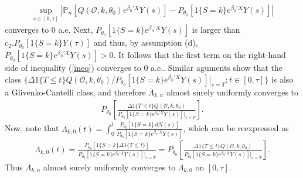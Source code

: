 \documentclass{statsoc}
\begin{document}
\begin{eqnarray*}
\sup_{s\in [0,\tau]}\left|\mathbb P_n\left[Q(\mathcal O,k,\theta_0)e^{\beta_0'X}Y(s)\right]-P_{\theta_0}\left[1\{S=k\}e^{\beta_0'X}Y(s)\right]\right|
\end{eqnarray*}
converges to 0 a.e. Next, $P_{\theta_0}[1\{S=k\}e^{\beta_0'X}Y(s)]$ is larger than $c_2.P_{\theta_0}[1\{S=k\}Y(\tau)]$ and thus, by assumption (d), $P_{\theta_0}[1\{S=k\}e^{\beta_0'X}Y(s)]>0$. It follows that the first term on the right-hand side of inequality (\ref{ineq}) converges to 0 a.e.. Similar aguments show that the class $\{\Delta 1\{T\leq t\}Q(\mathcal O,k,\theta_0)\slash P_{\theta_0}[1\{S=k\}e^{\beta_0'X}Y(s)]\left.\right|_{s=T}:t\in [0,\tau]\}$ is also a Glivenko-Cantelli class, and therefore $\overline\Lambda_{k,n}$ almost surely uniformly converges to 
\begin{eqnarray*}
P_{\theta_0}\left[\frac{\Delta 1\{T\leq t\}Q(\mathcal O,k,\theta_0)}{P_{\theta_0}\left[1\{S=k\}e^{\beta_0'X}Y(s)\right]\left.\right|_{s=T}}\right].
\end{eqnarray*}
Now, note that $\Lambda_{k,0}(t)=\int_0^t\frac{P_{\theta_0}[1\{S=k\}\,dN(s)]}{P_{\theta_0}[1\{S=k\}e^{\beta_0'X}Y(s)]}$, which can be reexpressed as
\begin{eqnarray*}
\Lambda_{k,0}(t)=\frac{P_{\theta_0}\left[1\{S=k\}\Delta1\{T\leq t\}\right]}{P_{\theta_0}\left[1\{S=k\}e^{\beta_0'X}Y(s)\right]\left.\right|_{s=T}}=P_{\theta_0}\left[\frac{\Delta 1\{T\leq t\}Q(\mathcal O,k,\theta_0)}{P_{\theta_0}\left[1\{S=k\}e^{\beta_0'X}Y(s)\right]\left.\right|_{s=T}}\right].
\end{eqnarray*}
Thus $\overline\Lambda_{k,n}$ almost surely uniformly converges to $\Lambda_{k,0}$ on $[0,\tau]$.
\end{document}
